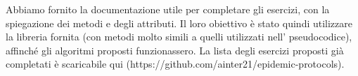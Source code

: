 Abbiamo fornito la documentazione utile per completare gli esercizi, con la spiegazione dei metodi e degli attributi. Il loro obiettivo è stato quindi utilizzare la libreria fornita (con metodi molto simili a quelli utilizzati nell' pseudocodice), affinché gli algoritmi proposti funzionassero. La lista degli esercizi proposti già completati è scaricabile qui (https://github.com/ainter21/epidemic-protocols).

